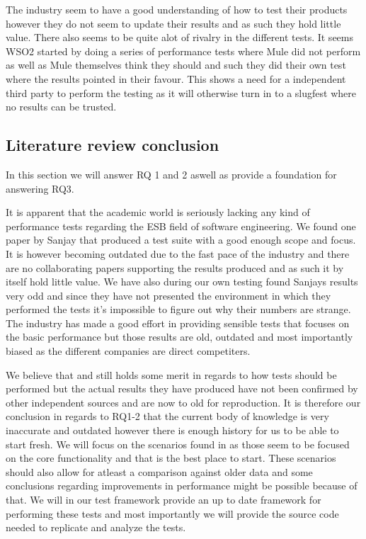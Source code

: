 The industry seem to have a good understanding of how to test their products however they do not seem to update their results and as such they hold little value.
There also seems to be quite alot of rivalry in the different tests. 
It seems WSO2 started by doing a series of performance tests \cite{Perera07,Perera07R2,Perera07R3}  where Mule did not perform as well as Mule themselves think they should and such they did their own test \cite{mulesoft08} where the results pointed in their favour.
This shows a need for a independent third party to perform the testing as it will otherwise turn in to a slugfest where no results can be trusted. 

\subsection{Literature review conclusion}
In this section we will answer RQ 1 and 2 aswell as provide a foundation for answering RQ3.

It is apparent that the academic world is seriously lacking any kind of performance tests regarding the ESB field of software engineering. 
We found one paper by Sanjay \cite{Sanjay2011} that produced a test suite with a good enough scope and focus. 
It is however becoming outdated due to the fast pace of the industry and there are no collaborating papers supporting the results produced and as such it by itself hold little value. 
We have also during our own testing found Sanjays results very odd and since they have not presented the environment in which they performed the tests it's impossible to figure out why their numbers are strange. 
The industry has made a good effort in providing sensible tests that focuses on the basic performance but those results are old, outdated and most importantly biased as the different companies are direct competiters. 

We believe that \cite{Sanjay2011} and \cite{Perera07,Perera07R2,Perera07R3,mulesoft08} still holds some merit in regards to how tests should be performed but the actual results they have produced have not been confirmed by other independent sources and are now to old for reproduction. 
It is therefore our conclusion in regards to RQ1-2 that the current body of knowledge is very inaccurate and outdated however there is enough history for us to be able to start fresh.
We will focus on the scenarios found in \cite{Perera07,Perera07R2,Perera07R3,mulesoft08,Sanjay2011} as those seem to be focused on the core functionality and that is the best place to start.
These scenarios should also allow for atleast a comparison against older data and some conclusions regarding improvements in performance might be possible because of that.
We will in our test framework provide an up to date framework for performing these tests and most importantly we will provide the source code needed to replicate and analyze the tests.

